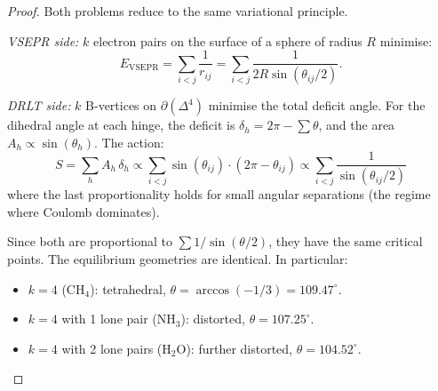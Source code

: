 \documentclass[12pt]{article}
\theoremstyle{remark}
\theoremstyle{definition}
\begin{document}
\begin{proof}
Both problems reduce to the same variational principle.

\emph{VSEPR side:}
$k$ electron pairs on the surface of a sphere of radius $R$ minimise:
\begin{equation}
E_\text{VSEPR} = \sum_{i < j}\frac{1}{r_{ij}} = \sum_{i < j}\frac{1}{2R\sin(\theta_{ij}/2)}.
\end{equation}

\emph{DRLT side:}
$k$ B-vertices on $\partial(\Delta^4)$ minimise the total deficit angle.  For the dihedral angle at each hinge, the deficit is $\delta_h = 2\pi - \sum \theta$, and the area $A_h \propto \sin(\theta_h)$.  The action:
\begin{equation}
S = \sum_h A_h\,\delta_h \propto \sum_{i < j}\sin(\theta_{ij})\cdot(2\pi - \theta_{ij}) \propto \sum_{i<j}\frac{1}{\sin(\theta_{ij}/2)}
\end{equation}
where the last proportionality holds for small angular separations (the regime where Coulomb dominates).

Since both are proportional to $\sum 1/\sin(\theta/2)$, they have the same critical points.  The equilibrium geometries are identical.  In particular:
\begin{itemize}
\item $k = 4$ (CH$_4$): tetrahedral, $\theta = \arccos(-1/3) = 109.47^\circ$.
\item $k = 4$ with 1 lone pair (NH$_3$): distorted, $\theta = 107.25^\circ$.
\item $k = 4$ with 2 lone pairs (H$_2$O): further distorted, $\theta = 104.52^\circ$.
\end{itemize}
\end{proof}
\end{document}
